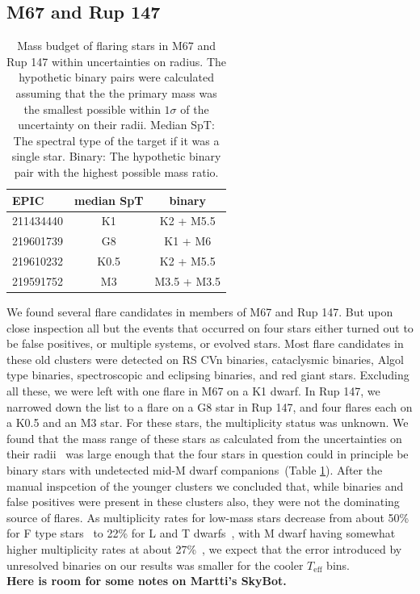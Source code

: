 \documentclass{aa}
\begin{document}
\subsection{M67 and Rup 147}
\begin{table}
\label{tab:m67_rup147_binaries}
\caption{Mass budget of flaring stars in M67 and Rup 147 within uncertainties on radius. The hypothetic binary pairs were calculated assuming that the the primary mass was the smallest possible within $1\sigma$ of the uncertainty on their radii. Median SpT: The spectral type of the target if it was a single star. Binary: The hypothetic binary pair with the highest possible mass ratio.}
\centering
\begin{tabular}{lcc}
\hline
 EPIC & median SpT &     binary \\
\hline
 211434440 &         K1 &    K2 + M5.5 \\
 219601739 &         G8 &      K1 + M6 \\
 219610232 &       K0.5 &    K2 + M5.5 \\
 219591752 &         M3 &  M3.5 + M3.5 \\
\hline
\end{tabular}
\end{table}
We found several flare candidates in members of M67 and Rup 147. But upon close inspection all but the events that occurred on four stars either turned out to be false positives, or multiple systems, or evolved stars. Most flare candidates in these old clusters were detected on RS CVn binaries, cataclysmic binaries, Algol type binaries, spectroscopic and eclipsing binaries, and red giant stars. Excluding all these, we were left with one flare in M67 on a K1 dwarf. In Rup 147, we narrowed down the list to a flare on a G8 star in Rup 147, and four flares each on a K0.5 and an M3 star. For these stars, the multiplicity status was unknown. We found that the mass range of these stars as calculated from the uncertainties on their radii~\citep{eker2018} was large enough that the four stars in question could in principle be binary stars with undetected mid-M dwarf companions~(Table \ref{tab:m67_rup147_binaries}). After the manual inspcetion of the younger clusters we concluded that, while binaries and false positives were present in these clusters also, they were not the dominating source of flares. As multiplicity rates for low-mass stars decrease from about 50\% for F type stars~\citep{raghavan_multiplicity_2010} to 22\% for L and T dwarfs~\citep{duchene_multiplicity_2013}, with M dwarf having somewhat higher multiplicity rates at about 27\%~\citep{winters2019}, we expect that the error introduced by unresolved binaries on our results was smaller for the cooler $T_\mathrm{eff}$ bins.
\\
\textbf{Here is room for some notes on Martti's SkyBot.}
\end{document}
